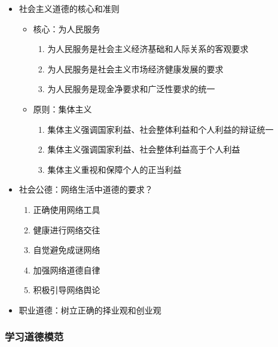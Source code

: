 \begin{itemize}
\tightlist
\item
  社会主义道德的核心和准则

  \begin{itemize}
  \tightlist
  \item
    核心：为人民服务

    \begin{enumerate}
    \def\labelenumi{\arabic{enumi}.}
    \tightlist
    \item
      为人民服务是社会主义经济基础和人际关系的客观要求
    \item
      为人民服务是社会主义市场经济健康发展的要求
    \item
      为人民服务是现金净要求和广泛性要求的统一
    \end{enumerate}
  \item
    原则：集体主义

    \begin{enumerate}
    \def\labelenumi{\arabic{enumi}.}
    \tightlist
    \item
      集体主义强调国家利益、社会整体利益和个人利益的辩证统一
    \item
      集体主义强调国家利益、社会整体利益高于个人利益
    \item
      集体主义重视和保障个人的正当利益
    \end{enumerate}
  \end{itemize}
\item
  社会公德：网络生活中道德的要求？

  \begin{enumerate}
  \def\labelenumi{\arabic{enumi}.}
  \tightlist
  \item
    正确使用网络工具
  \item
    健康进行网络交往
  \item
    自觉避免成谜网络
  \item
    加强网络道德自律
  \item
    积极引导网络舆论
  \end{enumerate}
\item
  职业道德：树立正确的择业观和创业观
\end{itemize}

\hypertarget{ux5b66ux4e60ux9053ux5fb7ux6a21ux8303}{%
\subsubsection{学习道德模范}\label{ux5b66ux4e60ux9053ux5fb7ux6a21ux8303}}

